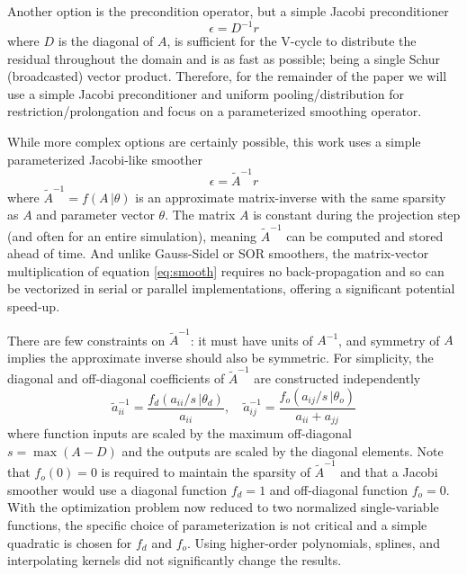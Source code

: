 \documentclass[review]{elsarticle}
\begin{document}
Another option is the precondition operator, but a simple Jacobi preconditioner
\begin{equation}
    \epsilon = D^{-1}r
\end{equation}
where $D$ is the diagonal of $A$, is sufficient for the V-cycle to distribute the residual throughout the domain and is as fast as possible; being a single Schur (broadcasted) vector product. Therefore, for the remainder of the paper we will use a simple Jacobi preconditioner and uniform pooling/distribution for restriction/prolongation and focus on a parameterized smoothing operator.

While more complex options are certainly possible, this work uses a simple parameterized Jacobi-like smoother
\begin{equation}\label{eq:smooth}
    \epsilon = \tilde A^{-1}r
\end{equation}
where $\tilde A^{-1}=f(A\,|\theta)$ is an approximate matrix-inverse with the same sparsity as $A$ and parameter vector $\theta$. The matrix $A$ is constant during the projection step (and often for an entire simulation), meaning $\tilde A^{-1}$ can be computed and stored ahead of time. And unlike Gauss-Sidel or SOR smoothers, the matrix-vector multiplication of equation \ref{eq:smooth} requires no back-propagation and so can be vectorized in serial or parallel implementations, offering a significant potential speed-up. 

There are few constraints on $\tilde A^{-1}$: it must have units of $A^{-1}$, and symmetry of $A$ implies the approximate inverse should also be symmetric. For simplicity, the diagonal and off-diagonal coefficients of $\tilde A^{-1}$ are constructed independently 
\begin{equation}\label{eq:approxinv}
    \tilde a^{-1}_{ii} = \frac{f_d(a_{ii}/s\,|\theta_d)}{a_{ii}} , \quad
    \tilde a^{-1}_{ij} = \frac{f_o(a_{ij}/s\,|\theta_o)}{a_{ii}+a_{jj}}
\end{equation}
where function inputs are scaled by the maximum off-diagonal $s=\max(A-D)$ and the outputs are scaled by the diagonal elements. Note that $f_o(0)=0$ is required to maintain the sparsity of $\tilde A^{-1}$ and that a Jacobi smoother would use a diagonal function $f_d=1$ and off-diagonal function $f_o=0$. With the optimization problem now reduced to two normalized single-variable functions, the specific choice of parameterization is not critical and a simple quadratic is chosen for $f_d$ and $f_o$. Using higher-order polynomials, splines, and interpolating kernels did not significantly change the results.
\end{document}
